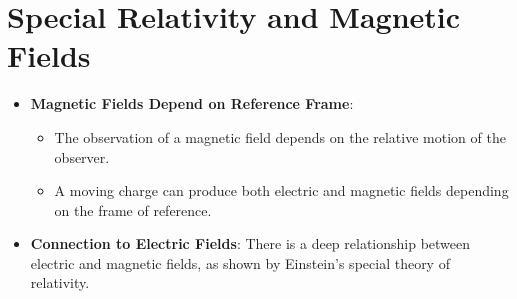 \documentclass{article}
\begin{document}
\section*{Special Relativity and Magnetic Fields}
\begin{itemize}
    \item \textbf{Magnetic Fields Depend on Reference Frame}:
    \begin{itemize}
        \item The observation of a magnetic field depends on the relative motion of the observer.
        \item A moving charge can produce both electric and magnetic fields depending on the frame of reference.
    \end{itemize}
    \item \textbf{Connection to Electric Fields}: There is a deep relationship between electric and magnetic fields, as shown by Einstein's special theory of relativity.
\end{itemize}
\end{document}
